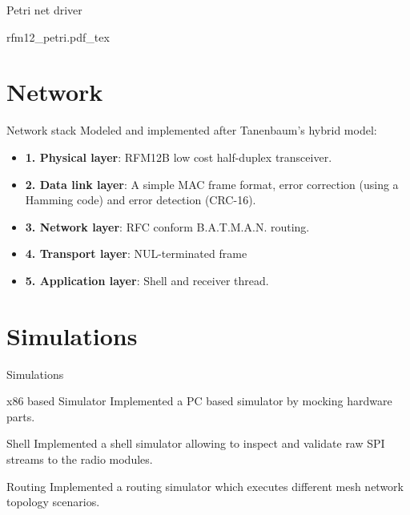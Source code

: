 \begin{frame}{Petri net driver}
\begin{center}
\scalebox{0.8} {
    {rfm12_petri.pdf_tex}
}
\end{center}
\end{frame}

\section{Network}
\begin{frame}{Network stack}
Modeled and implemented after Tanenbaum's hybrid model:

\begin{itemize}
    \item \textbf{1. Physical layer}: RFM12B low cost half-duplex transceiver.
    \item \textbf{2. Data link layer}: A simple MAC frame format, error correction (using a Hamming code) and error detection (CRC-16).
    \item \textbf{3. Network layer}: RFC conform B.A.T.M.A.N. routing.
    \item \textbf{4. Transport layer}: NUL-terminated frame
    \item \textbf{5. Application layer}: Shell and receiver thread.
\end{itemize}
\end{frame}

\section{Simulations}
\begin{frame}{Simulations}
\begin{block}{x86 based Simulator}
Implemented a PC based simulator by mocking hardware parts.
\end{block}

\begin{block}{Shell}
Implemented a shell simulator allowing to inspect and validate raw SPI streams to the radio modules.
\end{block}

\begin{block}{Routing}
Implemented a routing simulator which executes different mesh network topology scenarios. 
\end{block}
\end{frame}

